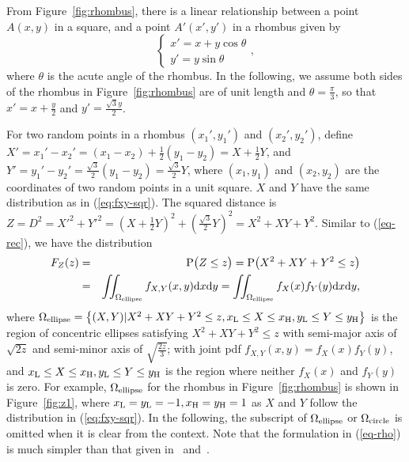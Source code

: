 \documentclass[12pt,draftclsnofoot,onecolumn]{IEEEtran}
\begin{document}
From Figure~\ref{fig:rhombus}, there is a linear relationship between a point $A
(x,y)$ in a square, and a point $A' (x',y')$ in a rhombus given by
\begin{equation}\label{eq:xr}
 \left\{
\begin{array}{lc}
x'=x+y\cos \theta \\
y'=y \sin \theta
\end{array}
\right.,
\end{equation}
where $\theta$ is the acute angle of the rhombus. In the following, we
assume both sides of the rhombus in Figure~\ref{fig:rhombus} are of unit
length and $\theta=\frac{\pi}{3}$, so that $x'=x+\frac{y}{2}$ and $y'=\frac{\sqrt{3}y}{2}$.

For two random points in a rhombus $(x_1',y_1')$ and $(x_2',y_2')$, define
$X'=x_1'-x_2'=\left(x_1-x_2\right)+\frac{1}{2}\left(y_1-y_2\right)=X+\frac{1}{2}
Y$, and
$Y'=y_1'-y_2'=\frac{\sqrt{3}}{2}\left(y_1-y_2\right)=\frac{\sqrt{3}}{2}Y$, where
$(x_1, y_1)$ and $(x_2, y_2)$ are the coordinates of two random points in a
unit square. $X$ and $Y$ have the same distribution as in
(\ref{eq:fxy-sqr}). The squared distance is $Z=D^2=X'^2+Y'^2=\left(X+\frac{1}{2}
Y\right)^2+\left(\frac{\sqrt{3}}{2}Y\right)^2=X^2+XY+Y^2$. Similar to
(\ref{eq-rec}), we have the distribution
\begin{eqnarray}\label{eq-rho}
F_Z(z)&=&{\rm P}\big(Z \leq z \big) = {\rm P}\big(X^2+XY+Y^2 \leq z \big)\nonumber\\
&=&\iint_{\Omega_{\rm ellipse}}f_{X,Y}(x,y){\rm d}x{\rm d}y=
\iint_{\Omega_{\rm ellipse}}f_X(x)f_Y(y){\rm d}x{\rm d}y,
\end{eqnarray}
where $\Omega_{\rm ellipse}=\left\{(X,Y)|X^2+XY+Y^2\leq z, x_{\rm L} \leq X \leq
x_{\rm H}, y_{\rm L}\leq Y \leq y_{\rm H}\right\}$ is the region of concentric ellipses
satisfying $X^2+XY+Y^2\leq z$
with semi-major axis of $\sqrt{2z}$ and semi-minor axis of $\sqrt{\frac{2z}{3}}$;
with joint pdf $f_{X, Y}(x, y)=f_X(x)f_Y(y)$, and $x_{\rm L} \leq X \leq x_{\rm H}, y_{\rm L}\leq
Y \leq y_{\rm H}$ is the region where neither $f_X(x)$ and $f_Y(y)$ is zero.
For example, $\Omega_{\rm ellipse}$ for the rhombus in Figure~\ref{fig:rhombus}
is shown in Figure~\ref{fig:z1}, where $x_{\rm L}=y_{\rm L}=-1, x_{\rm H}=y_{\rm H}=1$
as $X$ and $Y$ follow the distribution in (\ref{eq:fxy-sqr}).
In the following, the subscript of $\Omega_{\rm ellipse}$ or $\Omega_{\rm circle}$ is
omitted when it is clear from the context.
Note that the formulation in (\ref{eq-rho}) is much simpler than that given in~\cite{zhuang2011random}
and~\cite{zhuang2012geometrical}.
\end{document}
